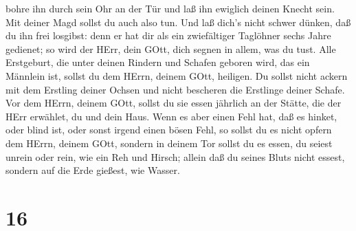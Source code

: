 bohre ihn durch sein Ohr an der Tür und laß ihn ewiglich deinen Knecht
sein. Mit deiner Magd sollst du auch also tun.  Und laß
dich's nicht schwer dünken, daß du ihn frei losgibst: denn er hat dir
als ein zwiefältiger Taglöhner sechs Jahre gedienet; so wird der HErr,
dein GOtt, dich segnen in allem, was du tust.  Alle
Erstgeburt, die unter deinen Rindern und Schafen geboren wird, das ein
Männlein ist, sollst du dem HErrn, deinem GOtt, heiligen. Du sollst
nicht ackern mit dem Erstling deiner Ochsen und nicht bescheren die
Erstlinge deiner Schafe.  Vor dem HErrn, deinem GOtt,
sollst du sie essen jährlich an der Stätte, die der HErr erwählet, du
und dein Haus.  Wenn es aber einen Fehl hat, daß es hinket,
oder blind ist, oder sonst irgend einen bösen Fehl, so sollst du es
nicht opfern dem HErrn, deinem GOtt,  sondern in deinem Tor
sollst du es essen, du seiest unrein oder rein, wie ein Reh und Hirsch;
 allein daß du seines Bluts nicht essest, sondern auf die
Erde gießest, wie Wasser.

\hypertarget{section-15}{%
\section{16}\label{section-15}}

